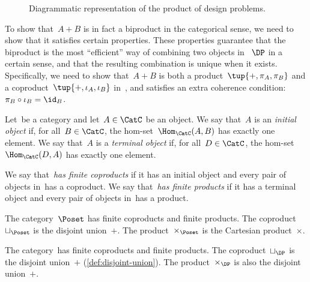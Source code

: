 \begin{figure}[h!]
  \begin{center}
  \end{center}
  \caption{Diagrammatic representation of the product of design problems. \label{fig:productdp}}
\end{figure}


To show that~$A + B$ is in fact a biproduct in the categorical sense, we need to show that it satisfies certain properties. These properties guarantee that the biproduct is the most ``efficient'' way of combining two objects in~$~\DP$ in a certain sense, and that the resulting combination is unique when it exists. Specifically, we need to show that~$A + B$ is both a product~$\tup{+, \pi_A, \pi_B}$ and a coproduct~$\tup{+, \iota_A, \iota_B}$ in~\DP, and satisfies an extra coherence condition:~$\pi_B \circ \iota_B = \id_B$.

\begin{ctdefinition}
  Let~\CatC be a category and let~$A \in \CatC$ be an object. We say that~$A$ is an \emph{initial object} if, for all~$B \in\CatC$, the hom-set~$\Hom_\CatC(A,B)$ has exactly one element. We say that~$A$ is a \emph{terminal object} if, for all~$D\in\CatC$, the hom-set~$\Hom_\CatC(D,A)$ has exactly one element.
\end{ctdefinition}

\begin{ctdefinition}
  We say that~\CatC \emph{has finite coproducts} if it has an initial object and every pair of objects in~\CatC has a coproduct.
  We say that~\CatC \emph{has finite products} if it has a terminal object and every pair of objects in~\CatC has a product.
\end{ctdefinition}

\begin{example}
  The category~$\Poset$ has finite coproducts and finite products.
  The coproduct~$\sqcup_\Poset$ is the disjoint union~$+$.
  The product~$\times_\Poset$ is the Cartesian product~$\times$.
\end{example}

\begin{lemma}
  The category~\DP has finite coproducts and finite products.
  The coproduct~$\sqcup_\DP$ is the disjoint union~$+$ (\cref{def:disjoint-union}).
  The product~$\times_\DP$ is also the disjoint union~$+$.
\end{lemma}

